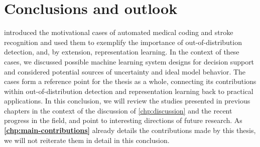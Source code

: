 
\chapter[conclusions and outlook]{Conclusions and outlook}\label{chp:conclusion}

\textbf{} introduced the motivational cases of automated medical coding and stroke recognition and used them to exemplify the importance of out-of-distribution detection, and, by extension, representation learning. In the context of these cases, we discussed possible machine learning system designs for decision support and considered potential sources of uncertainty and ideal model behavior. 
The cases form a reference point for the thesis as a whole, connecting its contributions within out-of-distribution detection and representation learning back to practical applications. 
In this conclusion, we will review the studies presented in previous chapters in the context of the discussion of \cref{chp:discussion} and the recent progress in the field, and point to interesting directions of future research. 
As \textbf{\cref{chp:main-contributions}} already details the contributions made by this thesis, we will not reiterate them in detail in this conclusion. 



